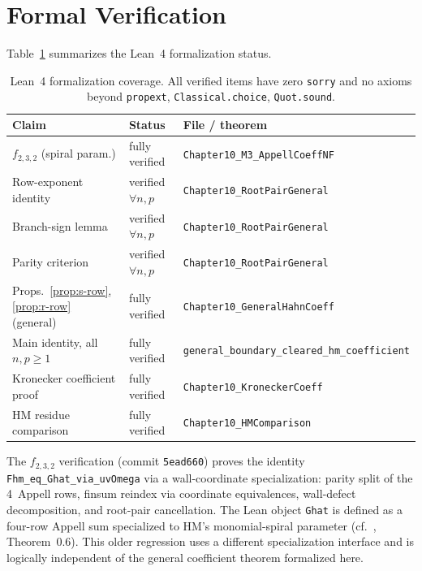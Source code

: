 \documentclass[11pt]{article}
\begin{document}
\section{Formal Verification}\label{sec:lean}

Table~\ref{tab:lean} summarizes the Lean~4 formalization status.

\begin{table}[ht]
\centering
\begin{tabular}{lll}
\hline
\textbf{Claim} & \textbf{Status} & \textbf{File / theorem} \\
\hline
$f_{2,3,2}$ (spiral param.) & fully verified & \texttt{Chapter10\_M3\_AppellCoeffNF} \\
Row-exponent identity & verified $\forall n,p$ & \texttt{Chapter10\_RootPairGeneral} \\
Branch-sign lemma & verified $\forall n,p$ & \texttt{Chapter10\_RootPairGeneral} \\
Parity criterion & verified $\forall n,p$ & \texttt{Chapter10\_RootPairGeneral} \\
Props.~\ref{prop:s-row},\ref{prop:r-row} (general) & fully verified & \texttt{Chapter10\_GeneralHahnCoeff} \\
Main identity, all $n,p\ge1$ & fully verified & \texttt{general\_boundary\_cleared\_hm\_coefficient} \\
Kronecker coefficient proof & fully verified & \texttt{Chapter10\_KroneckerCoeff} \\
HM residue comparison & fully verified & \texttt{Chapter10\_HMComparison} \\
\hline
\end{tabular}
\caption{Lean~4 formalization coverage.  All verified items have
zero \texttt{sorry} and no axioms beyond \texttt{propext},
\texttt{Classical.choice}, \texttt{Quot.sound}.}
\label{tab:lean}
\end{table}

The $f_{2,3,2}$ verification (commit \texttt{5ead660})
proves the identity
\texttt{Fhm\_eq\_Ghat\_via\_uvOmega} via a wall-coordinate
specialization: parity split of the 4~Appell rows, finsum
reindex via coordinate equivalences, wall-defect decomposition,
and root-pair cancellation.  The Lean object \texttt{Ghat}
is defined as a four-row Appell sum specialized to HM's
monomial-spiral parameter (cf.~\cite{jHiMo14}, Theorem~0.6).
This older regression uses a different specialization interface and is
logically independent of the general coefficient theorem formalized here.
\end{document}
